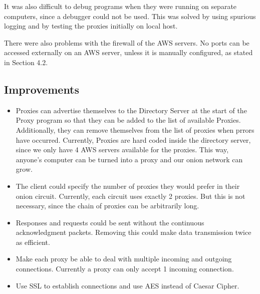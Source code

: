 \documentclass{article}
\begin{document}
\vspace{0.3 cm}

\noindent It was also difficult to debug programs when they were running on separate computers, since a debugger could not be used. This was solved by using spurious logging and by testing the proxies initially on local host.\\

\vspace{0.3 cm}

\noindent There were also problems with the firewall of the AWS servers. No ports can be accessed externally on an AWS server, unless it is manually configured, as stated in Section 4.2. 

\vspace{0.3 cm}

\subsection{Improvements}
\begin{itemize}  
\item Proxies can advertise themselves to the Directory Server at the start of the Proxy program so that they can be added to the list of available Proxies. Additionally, they can remove themselves from the list of proxies when prrors have occurred. Currently, Proxies are hard coded inside the directory server, since we only have 4 AWS servers available for the proxies. This way, anyone's computer can be turned into a proxy and our onion network can grow.\\

\vspace{0.1 cm}

\item The client could specify the number of proxies they would prefer in their onion circuit. Currently, each circuit uses exactly 2 proxies. But this is not necessary, since the chain of proxies can be arbitrarily long.\\

\vspace{0.1 cm}

\item Responses and requests could be sent without the continuous acknowledgment packets. Removing this could make data transmission twice as efficient.\\

\vspace{0.1 cm}

\item Make each proxy be able to deal with multiple incoming and outgoing  connections. Currently a proxy can only accept 1 incoming connection.\\

\vspace{0.1 cm}

\item Use SSL to establish
connections and use AES instead of Caesar Cipher.\\

\vspace{0.1 cm}

\end{itemize}
\end{document}

